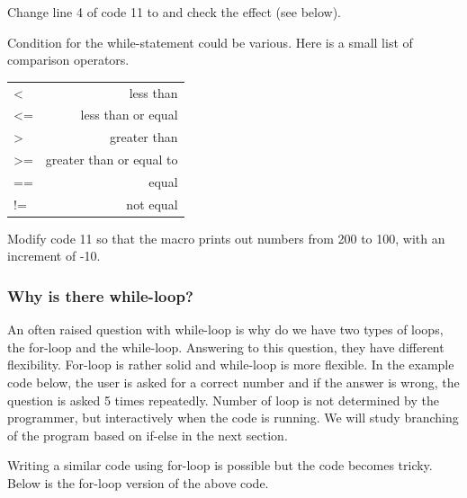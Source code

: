 \begin{indentexercise}{2}
Change line 4 of code 11 to  and check the effect (see below).
\end{indentexercise}



Condition for the while-statement could be various. Here is a small list of comparison operators.

\begin{indentCom}
 \begin{tabular*}{0.5\textwidth}{ l r }
< & less than \\
<= & less than or equal\\ 
> & greater than\\ 
>= & greater than or equal to\\
== & equal\\
!= & not equal\\
 \end{tabular*}
\end{indentCom}

\begin{indentexercise}{3}
Modify code 11 so that the macro prints out numbers from 200 to 100, with an increment of -10. 
\end{indentexercise}

\subsubsection{Why is there while-loop?}

An often raised question with while-loop is why do we have two types of loops, 
the for-loop and the while-loop. Answering to this question, they have different
flexibility. For-loop is rather solid and while-loop is more flexible. In the
example code below, the user is asked for a correct number and if the answer is wrong, the
question is asked 5 times repeatedly. Number of loop is not determined by the
programmer, but interactively when the code is running. We will study
branching of the program based on if-else in the next section.  



Writing a similar code using for-loop is possible but the code becomes tricky.
Below is the for-loop version of the above code.  



